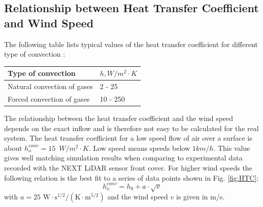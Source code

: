 \subsection{Relationship between Heat Transfer Coefficient and Wind Speed}\label{chapter:windspeedrelation}
The following table lists typical values of the heat transfer coefficient for different type of convection \cite{Cengel2002}: 




\begin{table} [H]
\centering
\color{B}
\begin{tabular} [h] {  p{50mm} p{27mm} }
Type of convection & $h, \unit{W/{m^2\cdot K}}$ \\ \hline
Natural convection of gases & 2 - 25 \\ 
Forced convection of gases & 10 - 250 
\end{tabular}
\end{table}
The relationship between the heat transfer coefficient and the wind speed depends on the exact inflow and is therefore not easy to be calculated for the real system. The heat transfer coefficient for a low speed flow of air over a surface is about \(h_o^{conv} = 15 \,\,\,\unit{W/m^2\cdot K}\). Low speed means speeds below $1 \unit{km/h}$. This value gives well matching simulation results when comparing to experimental data recorded with the NEXT LiDAR sensor front cover. For higher wind speeds the following relation is the best fit to a series of data points shown in Fig. \ref{fig:HTC}: 
\begin{equation}
h_o^{conv} = h_0 + a\cdot \sqrt{v}
\end{equation}
with \(a = 25 \, \,\mathrm{W\cdot s^{1/2}/(K\cdot m^{5/2})}\) and the wind speed $v$ is given in m/s. 

